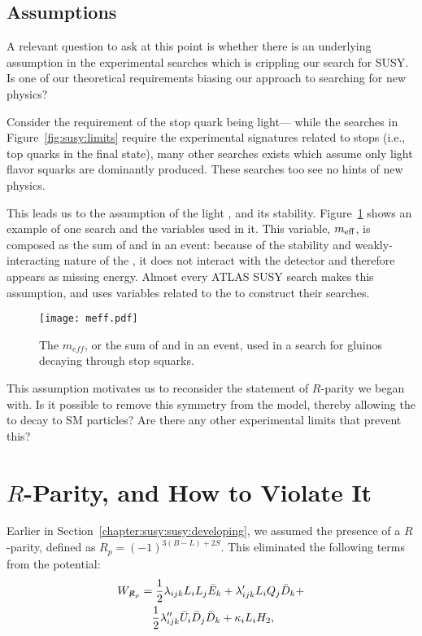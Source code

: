 \subsection{Assumptions}

A relevant question to ask at this point is whether there is an underlying assumption in the experimental searches which is crippling our search for SUSY. Is one of our theoretical requirements biasing our approach to searching for new physics?

Consider the requirement of the stop quark being light--- while the searches in Figure~\ref{fig:susy:limits} require the experimental signatures related to stops (i.e., top quarks in the final state), many other searches exists which assume only light flavor squarks are dominantly produced. These searches too see no hints of new physics.

This leads us to the assumption of the light \lsp, and its stability. Figure~\ref{fig:susy:meff} shows an example of one search and the variables used in it. This variable, $m_{\rm eff}$, is composed as the sum of \met and \Ht in an event: because of the stability and weakly-interacting nature of the \lsp, it does not interact with the detector and therefore appears as missing energy. Almost every ATLAS SUSY search makes this assumption, and uses variables related to the \met to construct their searches. 
 

\begin{figure}
\centering
\texttt{[image: meff.pdf]}
\label{fig:susy:meff}
\caption{The $m_{eff}$, or the sum of \met and \Ht in an event, used in a search for gluinos decaying through stop squarks.}
\end{figure}


This assumption motivates us to reconsider the statement of $R$-parity we began with. Is it possible to remove this symmetry from the model, thereby allowing the \lsp to decay to SM particles? Are there any other experimental limits that prevent this? 

\section{$R$-Parity, and How to Violate It}
\label{chapter:susy:r}
Earlier in Section~\ref{chapter:susy:susy:developing}, we assumed the presence of a $R$-parity, defined as $R_p = (-1)^{3(B-L)+2S}$. This eliminated the following terms from the potential\cite{dreinerRPV}:
%
  \begin{eqnarray} 
    W_{\not R_p} &= \frac{1}{2} \lambda_{ijk} L_{i}L_{j}\bar E_{k} + \lambda_{ijk}^{\prime} L_{i}Q_{j}\bar D_{k} +  \nonumber \\
       & \quad \frac{1}{2}\lambda_{ijk}^{\prime\prime}\bar U_{i}\bar D_{j}\bar D_{k} + \kappa_iL_{i}H_{2},
    \label{eqn:rpvandudd:wrpv}
  \end{eqnarray} 

